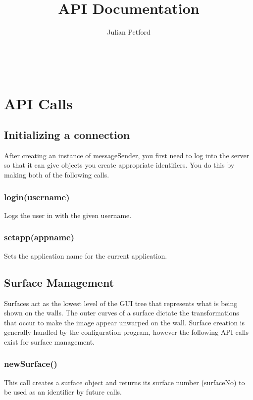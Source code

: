 \documentclass{acm_proc_article-sp}
\begin{document}

\title{API Documentation}

\author{
Julian Petford\\
       \\
       \\
       \\
}

\maketitle

\section{API Calls}
\subsection{Initializing a connection}
After creating an instance of messageSender, you first need to log into the server so that it can give objects you create appropriate identifiers. You do this by making both of the following calls.
\subsubsection{login(username)}
Logs the user in with the given username.
\subsubsection{setapp(appname)}
Sets the application name for the current application.

\subsection{Surface Management}
Surfaces act as the lowest level of the GUI tree that represents what is being shown on the walls. The outer curves of a surface dictate the transformations that occur to make the image appear unwarped on the wall. Surface creation is generally handled by the configuration program, however the following API calls exist for surface management.
\subsubsection{newSurface()}
This call creates a surface object and returns its surface number (surfaceNo) to be used as an identifier by future calls.
\end{document}
